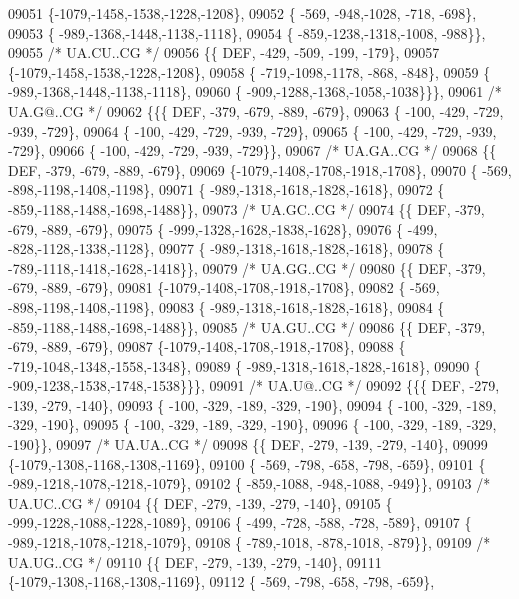 \begin{DoxyCode}
09051 \{-1079,-1458,-1538,-1228,-1208\},
09052 \{ -569, -948,-1028, -718, -698\},
09053 \{ -989,-1368,-1448,-1138,-1118\},
09054 \{ -859,-1238,-1318,-1008, -988\}\},
09055 \textcolor{comment}{/* UA.CU..CG */}
09056 \{\{  DEF, -429, -509, -199, -179\},
09057 \{-1079,-1458,-1538,-1228,-1208\},
09058 \{ -719,-1098,-1178, -868, -848\},
09059 \{ -989,-1368,-1448,-1138,-1118\},
09060 \{ -909,-1288,-1368,-1058,-1038\}\}\},
09061 \textcolor{comment}{/* UA.G@..CG */}
09062 \{\{\{  DEF, -379, -679, -889, -679\},
09063 \{ -100, -429, -729, -939, -729\},
09064 \{ -100, -429, -729, -939, -729\},
09065 \{ -100, -429, -729, -939, -729\},
09066 \{ -100, -429, -729, -939, -729\}\},
09067 \textcolor{comment}{/* UA.GA..CG */}
09068 \{\{  DEF, -379, -679, -889, -679\},
09069 \{-1079,-1408,-1708,-1918,-1708\},
09070 \{ -569, -898,-1198,-1408,-1198\},
09071 \{ -989,-1318,-1618,-1828,-1618\},
09072 \{ -859,-1188,-1488,-1698,-1488\}\},
09073 \textcolor{comment}{/* UA.GC..CG */}
09074 \{\{  DEF, -379, -679, -889, -679\},
09075 \{ -999,-1328,-1628,-1838,-1628\},
09076 \{ -499, -828,-1128,-1338,-1128\},
09077 \{ -989,-1318,-1618,-1828,-1618\},
09078 \{ -789,-1118,-1418,-1628,-1418\}\},
09079 \textcolor{comment}{/* UA.GG..CG */}
09080 \{\{  DEF, -379, -679, -889, -679\},
09081 \{-1079,-1408,-1708,-1918,-1708\},
09082 \{ -569, -898,-1198,-1408,-1198\},
09083 \{ -989,-1318,-1618,-1828,-1618\},
09084 \{ -859,-1188,-1488,-1698,-1488\}\},
09085 \textcolor{comment}{/* UA.GU..CG */}
09086 \{\{  DEF, -379, -679, -889, -679\},
09087 \{-1079,-1408,-1708,-1918,-1708\},
09088 \{ -719,-1048,-1348,-1558,-1348\},
09089 \{ -989,-1318,-1618,-1828,-1618\},
09090 \{ -909,-1238,-1538,-1748,-1538\}\}\},
09091 \textcolor{comment}{/* UA.U@..CG */}
09092 \{\{\{  DEF, -279, -139, -279, -140\},
09093 \{ -100, -329, -189, -329, -190\},
09094 \{ -100, -329, -189, -329, -190\},
09095 \{ -100, -329, -189, -329, -190\},
09096 \{ -100, -329, -189, -329, -190\}\},
09097 \textcolor{comment}{/* UA.UA..CG */}
09098 \{\{  DEF, -279, -139, -279, -140\},
09099 \{-1079,-1308,-1168,-1308,-1169\},
09100 \{ -569, -798, -658, -798, -659\},
09101 \{ -989,-1218,-1078,-1218,-1079\},
09102 \{ -859,-1088, -948,-1088, -949\}\},
09103 \textcolor{comment}{/* UA.UC..CG */}
09104 \{\{  DEF, -279, -139, -279, -140\},
09105 \{ -999,-1228,-1088,-1228,-1089\},
09106 \{ -499, -728, -588, -728, -589\},
09107 \{ -989,-1218,-1078,-1218,-1079\},
09108 \{ -789,-1018, -878,-1018, -879\}\},
09109 \textcolor{comment}{/* UA.UG..CG */}
09110 \{\{  DEF, -279, -139, -279, -140\},
09111 \{-1079,-1308,-1168,-1308,-1169\},
09112 \{ -569, -798, -658, -798, -659\},

\end{DoxyCode}
